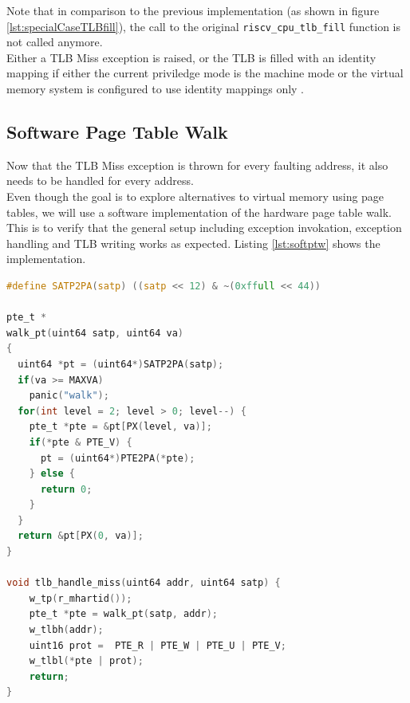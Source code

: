 Note that in comparison to the previous implementation (as shown in figure \ref{lst:specialCaseTLBfill}), the
call to the original \texttt{riscv\_cpu\_tlb\_fill} function is not called anymore.\\
Either a TLB Miss exception is raised, or the TLB is filled with an identity mapping if either the current
priviledge mode is the machine mode or the virtual memory system is configured to use identity mappings only
\cite{RISCVInstructionSet}.


\subsection{Software Page Table Walk}

Now that the TLB Miss exception is thrown for every faulting address, it also needs to be handled
for every address.\\
Even though the goal is to explore alternatives to virtual memory using page tables, we will
use a software implementation of the hardware page table walk. This is to verify that the
general setup including exception invokation, exception handling and TLB writing works as
expected.
Listing \ref{lst:softptw} shows the implementation.

\begin{lstlisting}[language=c,float=t,
    caption={\textbf{TLB Miss Exception Handler with Page Table Walk} 
    The \texttt{walk\_pt()} function walks the Sv39 page table with the base address
    encoded in the \texttt{satp} register. If a PTE with the valid bit set is found, the function
    returns the address encoded in the PTE.\\
    Otherwise, the function returns \texttt{0}.},
    label={lst:softptw}]
#define SATP2PA(satp) ((satp << 12) & ~(0xffull << 44))

pte_t *
walk_pt(uint64 satp, uint64 va)
{
  uint64 *pt = (uint64*)SATP2PA(satp);
  if(va >= MAXVA)
    panic("walk");
  for(int level = 2; level > 0; level--) {
    pte_t *pte = &pt[PX(level, va)];
    if(*pte & PTE_V) {
      pt = (uint64*)PTE2PA(*pte);
    } else {
      return 0;
    }
  }
  return &pt[PX(0, va)];
}

void tlb_handle_miss(uint64 addr, uint64 satp) {
    w_tp(r_mhartid());
    pte_t *pte = walk_pt(satp, addr);
    w_tlbh(addr);
    uint16 prot =  PTE_R | PTE_W | PTE_U | PTE_V;
    w_tlbl(*pte | prot);
    return;
}
\end{lstlisting}

